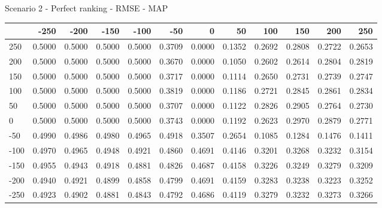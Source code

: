 Scenario 2 - Perfect ranking - RMSE - MAP
\begin{tabular}{lrrrrrrrrrrr}
\toprule
{} &   -250 &   -200 &   -150 &   -100 &   -50  &    0   &    50  &    100 &    150 &    200 &    250 \\
\midrule
 250 & 0.5000 & 0.5000 & 0.5000 & 0.5000 & 0.3709 & 0.0000 & 0.1352 & 0.2692 & 0.2808 & 0.2722 & 0.2653 \\
 200 & 0.5000 & 0.5000 & 0.5000 & 0.5000 & 0.3670 & 0.0000 & 0.1050 & 0.2602 & 0.2614 & 0.2804 & 0.2819 \\
 150 & 0.5000 & 0.5000 & 0.5000 & 0.5000 & 0.3717 & 0.0000 & 0.1114 & 0.2650 & 0.2731 & 0.2739 & 0.2747 \\
 100 & 0.5000 & 0.5000 & 0.5000 & 0.5000 & 0.3819 & 0.0000 & 0.1186 & 0.2721 & 0.2845 & 0.2861 & 0.2834 \\
 50  & 0.5000 & 0.5000 & 0.5000 & 0.5000 & 0.3707 & 0.0000 & 0.1122 & 0.2826 & 0.2905 & 0.2764 & 0.2730 \\
 0   & 0.5000 & 0.5000 & 0.5000 & 0.5000 & 0.3743 & 0.0000 & 0.1192 & 0.2623 & 0.2970 & 0.2879 & 0.2771 \\
-50  & 0.4990 & 0.4986 & 0.4980 & 0.4965 & 0.4918 & 0.3507 & 0.2654 & 0.1085 & 0.1284 & 0.1476 & 0.1411 \\
-100 & 0.4970 & 0.4965 & 0.4948 & 0.4921 & 0.4860 & 0.4691 & 0.4146 & 0.3201 & 0.3268 & 0.3232 & 0.3154 \\
-150 & 0.4955 & 0.4943 & 0.4918 & 0.4881 & 0.4826 & 0.4687 & 0.4158 & 0.3226 & 0.3249 & 0.3279 & 0.3209 \\
-200 & 0.4940 & 0.4921 & 0.4899 & 0.4858 & 0.4799 & 0.4691 & 0.4159 & 0.3283 & 0.3238 & 0.3223 & 0.3252 \\
-250 & 0.4923 & 0.4902 & 0.4881 & 0.4843 & 0.4792 & 0.4686 & 0.4119 & 0.3279 & 0.3232 & 0.3273 & 0.3266 \\
\bottomrule
\end{tabular}

